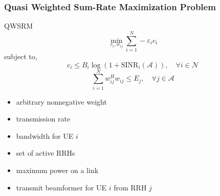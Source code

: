 \documentclass[usenames,dvipsnames]{beamer}
\begin{document}
\begin{frame}
  \frametitle{Quasi Weighted Sum-Rate Maximization Problem}
  \begin{exampleblock}{QWSRM}
    \[
      \min_{c_{i},w_{ij}} \sum_{i=1}^{N}-\varepsilon_{i}c_{i}
    \]
    subject to,
    \[
      c_{i} \leq B_{i}\log(1+\text{SINR}_{i}(\mathcal{A})),\quad \forall i\in \mathcal{N}
    \]
    \[
      \sum_{i=1}^{N}w_{ij}^{H}w_{ij}\leq E_{j},\quad \forall j\in \mathcal{A}
    \]
  \end{exampleblock}
  \begin{itemize}
    \item { arbitrary nonnegative weight}
    \item { transmission rate}
    \item { bandwidth for UE $i$}
    \item { set of active RRHs}
    \item { maximum power on a link}
    \item { transmit beamformer for UE $i$ from RRH $j$}
  \end{itemize}
\end{frame}
\end{document}
